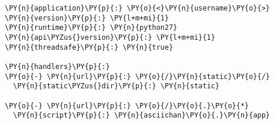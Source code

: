 \begin{Verbatim}[commandchars=\\\{\}]
\PY{n}{application}\PY{p}{:} \PY{o}{<}\PY{n}{username}\PY{o}{>}
\PY{n}{version}\PY{p}{:} \PY{l+m+mi}{1}
\PY{n}{runtime}\PY{p}{:} \PY{n}{python27}
\PY{n}{api\PYZus{}version}\PY{p}{:} \PY{l+m+mi}{1}
\PY{n}{threadsafe}\PY{p}{:} \PY{n}{true}

\PY{n}{handlers}\PY{p}{:}
\PY{o}{-} \PY{n}{url}\PY{p}{:} \PY{o}{/}\PY{n}{static}\PY{o}{/}
  \PY{n}{static\PYZus{}dir}\PY{p}{:} \PY{n}{static}

\PY{o}{-} \PY{n}{url}\PY{p}{:} \PY{o}{/}\PY{o}{.}\PY{o}{*}
  \PY{n}{script}\PY{p}{:} \PY{n}{asciichan}\PY{o}{.}\PY{n}{app}
\end{Verbatim}
